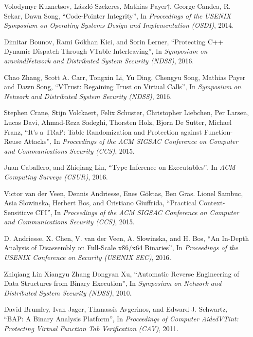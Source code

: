 \documentclass[11pt,a4paper,bibtotoc,idxtotoc,headsepline,footsepline,footexclude,BCOR20mm,DIV10]{scrbook}
\begin{document}
\begin{thebibliography}{50}
Volodymyr Kuznetsov, László Szekeres, Mathias Payer†, George Candea, R. Sekar, Dawn Song,
``{Code-Pointer Integrity}'', In
\emph{Proceedings of the USENIX Symposium on Operating Systems Design and Implementation (OSDI)}, 2014.

Dimitar Bounov, Rami Gökhan Kici, and Sorin Lerner,
``{Protecting C++ Dynamic Dispatch Through VTable Interleaving}'', In
\emph{Symposium on aravindNetwork and Distributed System Security (NDSS)}, 2016.

Chao Zhang, Scott A. Carr, Tongxin Li, Yu Ding, Chengyu Song, Mathias Payer and Dawn Song,
``{VTrust: Regaining Trust on Virtual Calls}'', In
\emph{Symposium on Network and Distributed System Security (NDSS)}, 2016.

Stephen Crane, Stijn Volckaert, Felix Schuster, Christopher Liebchen, Per Larsen,
Lucas Davi, Ahmad-Reza Sadeghi, Thorsten Holz, Bjorn De Sutter, Michael Franz,
``{It’s a TRaP: Table Randomization and Protection against Function-Reuse Attacks}'', In
\emph{Proceedings of the ACM SIGSAC Conference on Computer and Communications Security (CCS)}, 2015.

Juan Caballero, and Zhiqiang Lin,
``{Type Inference on Executables}'', In
\emph{ACM Computing Surveys (CSUR)}, 2016.

Victor van der Veen, Dennis Andriesse, Enes Göktas, Ben Gras.
Lionel Sambuc, Asia Slowinska, Herbert Bos, and Cristiano Giuffrida,
``{Practical Context-Sensiticve CFI}'', In
\emph{Proceedings of the ACM SIGSAC Conference on Computer and Communications Security (CCS)}, 2015.

D. Andriesse, X. Chen, V. van der Veen, A. Slowinska, and H. Bos, 
``{An In-Depth Analysis of Disassembly on Full-Scale x86/x64 Binaries}'', In
\emph{Proceedings of the USENIX Conference on Security (USENIX SEC)}, 2016.

Zhiqiang Lin Xiangyu Zhang Dongyan Xu,
``{Automatic Reverse Engineering of Data Structures from Binary Execution}'', In
\emph{Symposium on Network and Distributed System Security (NDSS)}, 2010.

David Brumley, Ivan Jager, Thanassis Avgerinos, and Edward J. Schwartz,
``{BAP: A Binary Analysis Platform}'', 
In \emph{Proceedings of Computer AidedVTint: Protecting Virtual Function Tab Verification (CAV)}, 2011.


\end{thebibliography}
\end{document}

